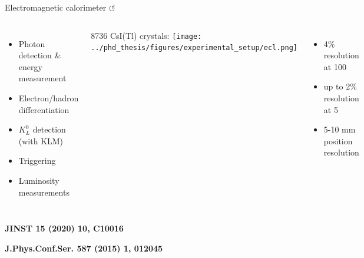 \documentclass[xcolor=dvipsnames]{beamer}
\begin{document}
\begin{frame}{Electromagnetic calorimeter \hyperlink{frame:A}{$\circlearrowleft$}}
   \centering\scriptsize
   \begin{columns}
      \begin{itemize}
         \item Photon detection \& energy measurement
         \item Electron/hadron differentiation
         \item $K_L^0$ detection (with KLM)
         \item Triggering
         \item Luminosity measurements
      \end{itemize}
      8736 CsI(Tl) crystals:
      \texttt{[image: ../phd\_thesis/figures/experimental\_setup/ecl.png]}
      \begin{itemize}
         \item 4\% resolution at 100~\mev 
         \item[] up to 2\% resolution at 5~\gev
         \item 5-10 mm position resolution
      \end{itemize}
   \end{columns}

   \begin{flushright}
      \tiny
      \textbf{JINST 15 (2020) 10, C10016}

      \textbf{J.Phys.Conf.Ser. 587 (2015) 1, 012045}
   \end{flushright}
\end{frame}
\end{document}
